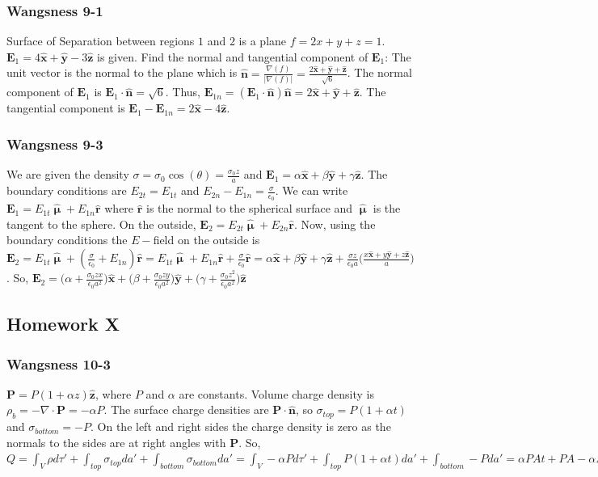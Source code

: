 \documentclass[crop=false,class=article,oneside]{standalone}
\begin{document}
        \subsubsection{Wangsness 9-1}
        Surface of Separation between regions $1$ and $2$ is a plane $f=2x+y+z=1$. $\mathbf{E}_1 = 4\hat{\mathbf{x}}+\hat{\mathbf{y}}-3\hat{\mathbf{z}}$ is given. Find the normal and tangential component of $\mathbf{E}_1$: The unit vector is the normal to the plane which is $\hat{\mathbf{n}}=\frac{\nabla(f)}{|\nabla(f)|} = \frac{2\hat{\mathbf{x}}+\hat{\mathbf{y}}+\hat{\mathbf{z}}}{\sqrt{6}}$. The normal component of $\mathbf{E}_1$ is $\mathbf{E}_1 \cdot \hat{\mathbf{n}} = \sqrt{6}$. Thus, $\mathbf{E}_{1n} = (\mathbf{E}_1 \cdot \hat{\mathbf{n}})\hat{\mathbf{n}} = 2\hat{\mathbf{x}}+\hat{\mathbf{y}}+\hat{\mathbf{z}}$. The tangential component is $\mathbf{E}_1 - \mathbf{E}_{1n} = 2\hat{\mathbf{x}}-4\hat{\mathbf{z}}$.
        \subsubsection{Wangsness 9-3}
        We are given the density $\sigma = \sigma_0 \cos(\theta) = \frac{\sigma_0 z}{a}$ and $\mathbf{E}_1 = \alpha \hat{\mathbf{x}}+\beta \hat{\mathbf{y}}+ \gamma \hat{\mathbf{z}}$. The boundary conditions are $E_{2t} = E_{1t}$ and $E_{2n}-E_{1n} = \frac{\sigma}{\epsilon_0}$. We can write $\mathbf{E}_1 = E_{1t}\hat{\boldsymbol{\upmu}}+E_{1n} \hat{\mathbf{r}}$ where $\hat{\mathbf{r}}$ is the normal to the spherical surface and $\hat{\boldsymbol{\upmu}}$ is the tangent to the sphere. On the outside, $\mathbf{E}_2 = E_{2t}\hat{\boldsymbol{\upmu}}+E_{2n}\hat{\mathbf{r}}$. Now, using the boundary conditions the $E-$field on the outside is $\mathbf{E}_2 = E_{1t}\hat{\boldsymbol{\upmu}}+(\frac{\sigma}{\epsilon_0}+E_{1n})\hat{\mathbf{r}} = E_{1t}\hat{\boldsymbol{\upmu}}+E_{1n}\hat{\mathbf{r}}+\frac{\sigma}{\epsilon_0}\hat{\mathbf{r}} = \alpha \hat{\mathbf{x}}+\beta \hat{\mathbf{y}}+\gamma \hat{\mathbf{z}} + \frac{\sigma z}{\epsilon_0 a}\bigg(\frac{x\hat{\mathbf{x}}+y\hat{\mathbf{y}}+z\hat{\mathbf{z}}}{a}\bigg)$. So, $\mathbf{E}_2 = \big(\alpha+\frac{\sigma_0 zx}{\epsilon_0 a^2}\big)\hat{\mathbf{x}}+\big(\beta + \frac{\sigma_0 zy}{\epsilon_0 a^2}\big)\hat{\mathbf{y}}+\big(\gamma+ \frac{\sigma_0 z^2}{\epsilon_0 a^2}\big)\hat{\mathbf{z}}$
    \subsection{Homework X}
        \subsubsection{Wangsness 10-3}
        $\mathbf{P}= P(1+\alpha z)\hat{\mathbf{z}}$, where $P$ and $\alpha$ are constants. Volume charge density is $\rho_{b} = -\nabla \cdot \mathbf{P} = -\alpha P$. The surface charge densities are $\mathbf{P}\cdot \hat{\mathbf{n}}$, so $\sigma_{top} = P(1+\alpha t)$ and $\sigma_{bottom} = -P$. On the left and right sides the charge density is zero as the normals to the sides are at right angles with $\mathbf{P}$. So, $Q = \int_{V} \rho d\tau' + \int_{top} \sigma_{top} da' + \int_{bottom} \sigma_{bottom} da' = \int_{V}-\alpha P d\tau' + \int_{top}P(1+\alpha t) da' + \int_{bottom} - Pda' = \alpha PAt + PA - \alpha PA t - PA = 0$
\end{document}
